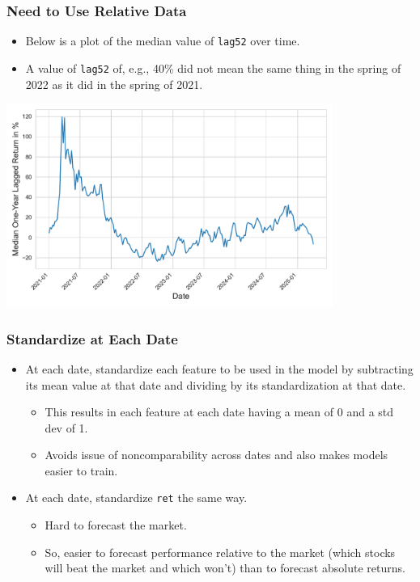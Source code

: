 \documentclass[10pt]{beamer}
\begin{document}
\begin{frame}[fragile]\frametitle{Need to Use Relative Data}
    \begin{itemize}
    \item Below is a plot of the median value of \verb!lag52! over time.
    \item A value of \verb!lag52! of, e.g., 40\% did not mean the same thing in the spring of 2022 as it did in the spring of 2021.
    \end{itemize}
    \begin{center}
    \includegraphics[width=0.8\textwidth]{lagret.pdf}
    \end{center}
     \end{frame}

\begin{frame}[fragile]\frametitle{Standardize at Each Date}
    \begin{itemize}
    \item At each date, standardize each feature to be used in the model by subtracting its mean value at that date and dividing by its standardization at that date.
    \begin{itemize}
    \item This results in each feature at each date having a mean of 0 and a std dev of 1.
    \item Avoids issue of noncomparability across dates and also makes models easier to train.
    \end{itemize}
    \item At each date, standardize \verb!ret! the same way.
    \begin{itemize}
    \item Hard to forecast the market.
    \item So, easier to forecast performance relative to the market (which stocks will beat the market and which won't) than to forecast absolute returns.
    \end{itemize}
\end{itemize}
    \end{frame}
\end{document}
